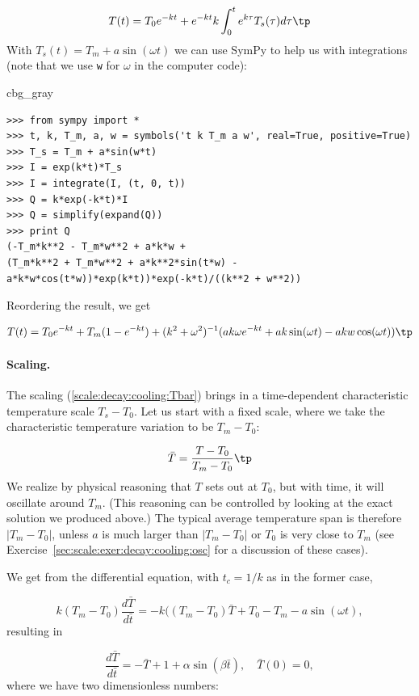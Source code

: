 \documentclass[graybox,envcountchap,sectrefs,final]{svmonodo}
\newenvironment{_cod_tight}[1]{
   \def\FrameCommand{\colorbox{#1}}
   \FrameRule0.6pt\MakeFramed {\FrameRestore}\vskip3mm}
   {\vskip0mm\endMakeFramed}
\newenvironment{cod}[1]{
\bgroup\rmfamily
\fboxsep=0mm\relax
\begin{_cod_tight}{#1}
\list{}{\parsep=-2mm\parskip=0mm\topsep=0pt\leftmargin=2mm
\rightmargin=2\leftmargin\leftmargin=4pt\relax}
\item\relax}
{\endlist\end{_cod_tight}\egroup}
\begin{document}
\[ T(t) = T_0e^{-kt} + e^{-kt}k\int_0^t e^{k\tau}T_s(\tau)d\tau\tp\]
With $T_s(t)=T_m + a\sin (\omega t)$ we can use SymPy to help us with
integrations (note that we use \texttt{w} for $\omega$ in the computer code):

\begin{cod}{cbg_gray}\begin{Verbatim}[numbers=none,fontsize=\fontsize{9pt}{9pt},baselinestretch=0.95,xleftmargin=2mm]
>>> from sympy import *
>>> t, k, T_m, a, w = symbols('t k T_m a w', real=True, positive=True)
>>> T_s = T_m + a*sin(w*t)
>>> I = exp(k*t)*T_s
>>> I = integrate(I, (t, 0, t))
>>> Q = k*exp(-k*t)*I
>>> Q = simplify(expand(Q))
>>> print Q
(-T_m*k**2 - T_m*w**2 + a*k*w +
(T_m*k**2 + T_m*w**2 + a*k**2*sin(t*w) -
a*k*w*cos(t*w))*exp(k*t))*exp(-k*t)/((k**2 + w**2))
\end{Verbatim}
\end{cod}
\noindent
Reordering the result, we get

\[ T(t) = T_0e^{-kt} + T_m(1- e^{-kt}) +  (k^2 + \omega^2)^{-1}(ak\omega e^{-kt}
+ ak\sin (\omega t) - akw\cos(\omega t))\tp\]


\paragraph{Scaling.}
The scaling (\ref{scale:decay:cooling:Tbar}) brings in a time-dependent
characteristic temperature scale $T_s-T_0$. Let us start with a
fixed scale, where we take the characteristic temperature variation to
be $T_m - T_0$:

\[ \bar T = \frac{T-T_0}{T_m-T_0}\tp\]
We realize by physical
reasoning that $T$ sets out at $T_0$, but with time, it will oscillate
around $T_m$. (This reasoning can be controlled by looking at the exact
solution we produced above.)
The typical average temperature span is therefore
$|T_m-T_0|$, unless $a$ is much larger than $|T_m-T_0|$ or $T_0$ is
very close to $T_m$ (see Exercise~\ref{sec:scale:exer:decay:cooling:osc} for
a discussion of these cases).

We get from the differential equation, with $t_c=1/k$ as in the former
case,

\[ k(T_m-T_0)\frac{d\bar T}{d\bar t} = -k((T_m-T_0)\bar T + T_0 - T_m - a
\sin(\omega t),\]
resulting in

\begin{equation}
\frac{d\bar T}{d\bar t} = -\bar T + 1 + \alpha\sin (\beta \bar t),\quad
\bar T(0)=0,
\label{scale:decay:cooling:model:scaled}
\end{equation}
where we have two dimensionless numbers:
\end{document}

